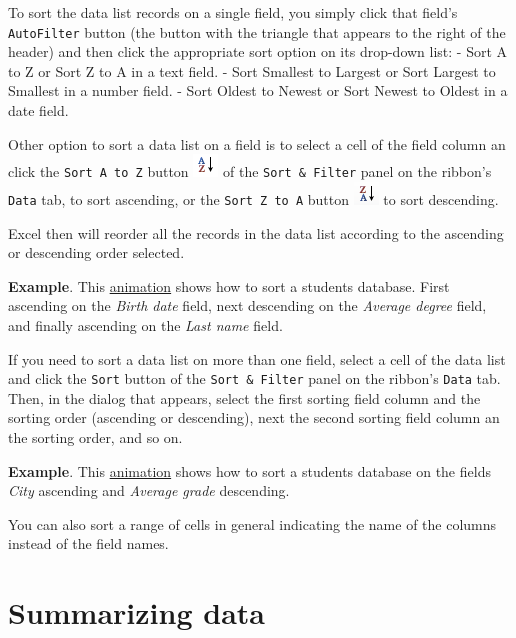 To sort the data list records on a single field, you simply click that field’s \texttt{AutoFilter} button (the button with the triangle that appears to the right of the header) and then click the appropriate sort option on its drop-down list:
- Sort A to Z or Sort Z to A in a text field.
- Sort Smallest to Largest or Sort Largest to Smallest in a number field.
- Sort Oldest to Newest or Sort Newest to Oldest in a date field.

Other option to sort a data list on a field is to select a cell of the field column an click the \texttt{Sort A to Z}
button \includegraphics[scale=0.7]{../img/button_az.png}  of the \texttt{Sort \& Filter} panel on the ribbon’s
\texttt{Data} tab, to sort ascending, or the \texttt{Sort Z to A} button
\includegraphics[scale=0.7]{../img/button_za.png} to sort descending.

Excel then will reorder all the records in the data list according to the ascending or descending order selected.

\textbf{Example}. This \href{http://aprendeconalf.es/office/excel/manual/img/example_database_sorting.gif}{animation} shows how to sort a students database. First ascending on the \emph{Birth date} field, next descending on the \emph{Average degree} field, and finally ascending on the \emph{Last name} field.

If you need to sort a data list on more than one field, select a cell of the data list and click the \texttt{Sort} button of the \texttt{Sort \& Filter} panel on the ribbon's \texttt{Data} tab. Then, in the dialog that appears, select the first sorting field column and the sorting order (ascending or descending), next the second sorting field column an the sorting order, and so on.

\textbf{Example}. This \href{http://aprendeconalf.es/office/excel/manual/img/example_database_sorting_on_multiple_fields.gif}{animation} shows how to sort a students database on the fields \emph{City} ascending and \emph{Average grade} descending.

You can also sort a range of cells in general indicating the name of the columns instead of the field names.

\section{Summarizing data}\hypertarget{summarizing-data}{}\label{summarizing-data}

